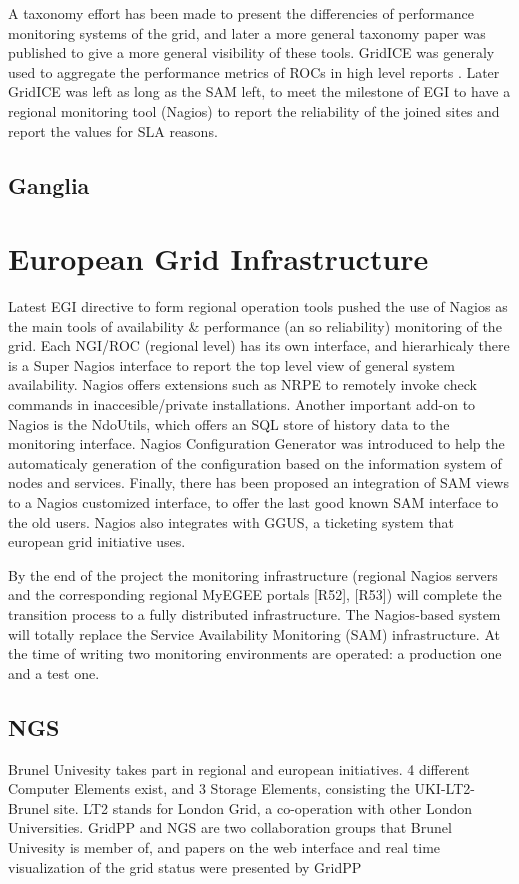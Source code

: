 A taxonomy effort has been made \cite{gerndt2004performance} to present the
differencies of performance monitoring systems of the grid, and later a more
general \cite{zanikolas2007importance} taxonomy paper was published to give a
more general visibility of these tools. GridICE was generaly used to aggregate
the performance metrics of ROCs in high level reports
\cite{andreozzi2005gridice}. Later GridICE was left as long as the SAM left, to
meet the milestone of EGI to have a regional monitoring tool (Nagios) to report
the reliability of the joined sites and report the values for SLA reasons.

\subsection{Ganglia}

\section{European Grid Infrastructure}
Latest EGI directive to form regional operation tools pushed the use of Nagios
\cite{imamagic2007grid} as the main tools of availability \& performance (an so
reliability) monitoring of the grid. Each NGI/ROC (regional level) has its own
interface, and hierarhicaly there is a Super Nagios interface to report the top
level view of general system availability. Nagios offers extensions such as NRPE
to remotely invoke check commands in inaccesible/private installations.
Another important add-on to Nagios is the NdoUtils, which offers an SQL store
of history data to the monitoring interface. Nagios Configuration Generator was
introduced to help the automaticaly generation of the configuration based on
the information system of nodes and services. Finally, there has been proposed
an integration of SAM views to a Nagios customized interface, to offer the last
good known SAM interface to the old users. Nagios also integrates with GGUS, a
ticketing system that european grid initiative uses.

By the end of the project the monitoring infrastructure (regional Nagios servers and the corresponding regional MyEGEE portals [R52], [R53]) will complete the transition process to a fully distributed infrastructure.
The Nagios-based system will totally replace the Service Availability Monitoring (SAM)
infrastructure. At the time of writing two monitoring environments are operated: a production one and a test one.


\subsection{NGS}
Brunel Univesity takes part in regional and european initiatives. 4 different
Computer Elements exist, and 3 Storage Elements, consisting the UKI-LT2-Brunel
site. LT2 stands for London Grid, a co-operation with other London Universities.
GridPP and NGS are two collaboration groups that Brunel Univesity is member of,
and papers on the web interface \cite{Hobson2007} and real time visualization of
the grid status were presented \cite{Huang2007} by GridPP
